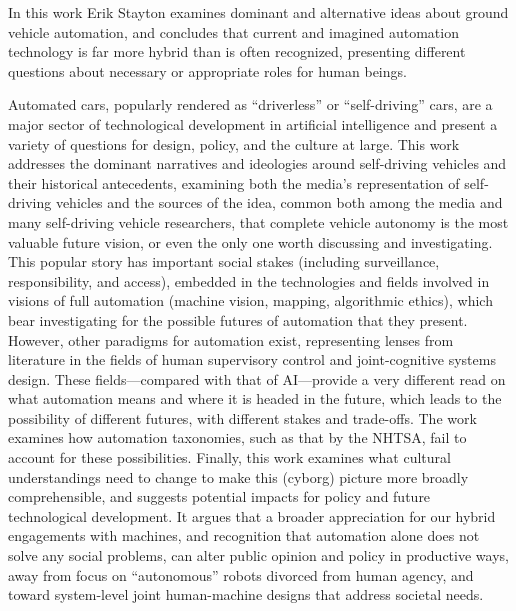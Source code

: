 % 
% 
%

In this work Erik Stayton examines dominant and alternative ideas about ground
vehicle automation, and concludes that current and imagined automation
technology is far more hybrid than 
is often recognized, presenting different questions about necessary or
appropriate roles for human beings.

Automated cars, popularly rendered as ``driverless'' or
``self-driving'' cars, are a major sector of technological
development in artificial intelligence and present a variety of
questions for design, policy, and the culture at large. This work addresses the
dominant narratives and ideologies around self-driving 
vehicles and their historical antecedents, examining both the media's representation
of self-driving vehicles and 
the sources of the idea, common both among the media and many
self-driving vehicle researchers, that complete vehicle autonomy is
the most valuable future vision, or even the only one  worth
discussing and investigating. 
This popular story has important social stakes (including
surveillance, responsibility, and access), embedded in the
technologies and fields involved in visions of full
automation (machine vision, mapping, algorithmic ethics), which bear investigating
for the possible futures of 
automation that they present.
However, other paradigms for automation exist,
representing lenses from
literature in the fields of human supervisory control and
joint-cognitive systems design. These fields---compared with
that of AI---provide a very
different read on what automation means and where it is headed in the
future, which leads to the possibility of different futures, with
different stakes and trade-offs. The work examines how automation
taxonomies, such as that by the NHTSA, fail to account for these
possibilities. Finally, this work examines what cultural 
understandings need to change to 
make this (cyborg) picture more broadly comprehensible, and suggests potential
impacts for policy and future technological development. It argues that
a broader appreciation for 
our hybrid engagements with machines, and recognition that automation
alone does not solve any social problems, can alter public
opinion and policy in productive ways, away from focus on
``autonomous'' robots divorced from human agency, and toward
system-level joint human-machine designs that address societal needs. 
